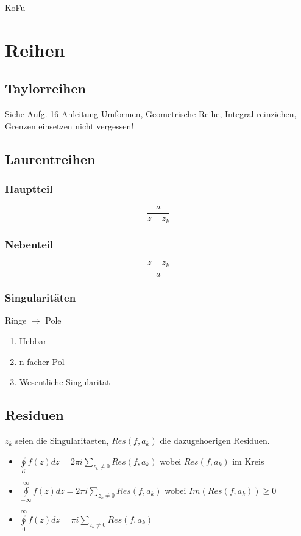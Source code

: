 \documentclass[10pt,a4paper]{article}
\begin{document}
KoFu

\section{Reihen}
\subsection{Taylorreihen}
Siehe Aufg. 16 Anleitung
Umformen, Geometrische Reihe, Integral reinziehen, Grenzen einsetzen nicht vergessen!


\subsection{Laurentreihen}
\subsubsection{Hauptteil}
\[
 \frac{a}{z-z_k}
\]
\subsubsection{Nebenteil}
\[
 \frac{z-z_k}{a}
\]

\subsubsection{Singularitäten}
Ringe $\rightarrow$ Pole
\begin{enumerate}
 \item Hebbar
 \item n-facher Pol
 \item Wesentliche Singularität
\end{enumerate}

\subsection{Residuen}
$z_k$ seien die Singularitaeten, $Res(f, a_k)$ die dazugehoerigen Residuen.
\begin{itemize}
\item $\oint\limits_{K} f(z) dz = 2 \pi i \sum\limits_{z_k \neq 0} Res(f, a_k)$ wobei $Res(f, a_k)$ im Kreis
\item $\oint\limits_{-\infty}^{\infty} f(z) dz = 2 \pi i \sum\limits_{z_k \neq 0} Res(f, a_k)$ wobei $Im(Res(f, a_k)) \geq 0$
\item $\oint\limits_{0}^{\infty} f(z) dz = \pi i \sum\limits_{z_k \neq 0} Res(f, a_k)$
\end{itemize}
\end{document}
